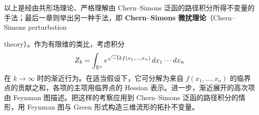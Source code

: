 以上是经由共形场理论、严格理解由 Chern--Simons 泛函的路径积分所得不变量的手法；最后一章则举出另一种手法，即 \textbf{Chern--Simons 微扰理论}（Chern--Simons perturbation

theory）。作为有限维的类比，考虑积分
\[
  Z_k=\int_{\mathbb{R}^{n}} e^{\sqrt{-1}k f(x_1,\dots,x_n)}\,dx_1\cdots dx_n
\]
在 $k\to\infty$ 时的渐近行为。在适当假设下，它可分解为来自 $f(x_1,\dots,x_n)$ 的临界点的贡献之和，各项的主项用临界点的 Hessian 表示。进一步，渐近展开的高次项由 Feynman 图描述。把这样的考察应用到 Chern--Simons 泛函的路径积分的情形，用 Feynman 图与 Green 形式构造三维流形的拓扑不变量。





